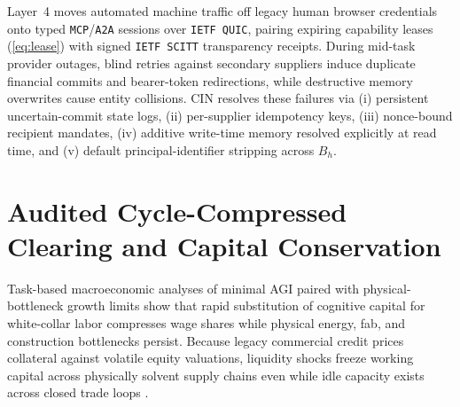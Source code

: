 \documentclass[11pt]{article}
\begin{document}
Layer~4 moves automated machine traffic off legacy human browser credentials onto typed \texttt{MCP}/\texttt{A2A} sessions over \texttt{IETF QUIC}, pairing expiring capability leases (\ref{eq:lease}) with signed \texttt{IETF SCITT} transparency receipts. During mid-task provider outages, blind retries against secondary suppliers induce duplicate financial commits and bearer-token redirections, while destructive memory overwrites cause entity collisions. CIN resolves these failures via (i) persistent uncertain-commit state logs, (ii) per-supplier idempotency keys, (iii) nonce-bound recipient mandates, (iv) additive write-time memory resolved explicitly at read time, and (v) default principal-identifier stripping across $B_h$.

\section{Audited Cycle-Compressed Clearing and Capital Conservation}\label{sec:clearing}

Task-based macroeconomic analyses of minimal AGI \citep{acemoglu2025simple, korinek2024scenarios} paired with physical-bottleneck growth limits \citep{nordhaus2021singularity} show that rapid substitution of cognitive capital for white-collar labor compresses wage shares while physical energy, fab, and construction bottlenecks persist. Because legacy commercial credit prices collateral against volatile equity valuations, liquidity shocks freeze working capital across physically solvent supply chains even while idle capacity exists across closed trade loops \citep{fleischman2026cycles}.
\end{document}
